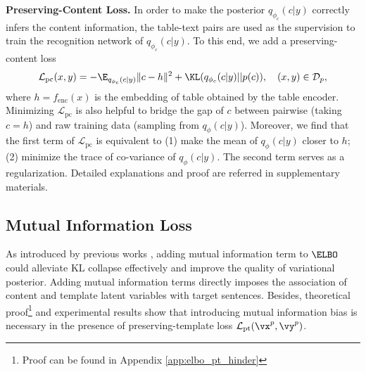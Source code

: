 \noindent\textbf{Preserving-Content Loss.}\quad
In order to make the posterior $q_{\phi_c}(c|y)$ correctly infers the content information, the table-text pairs are used as the supervision to train the recognition network of $q_{\phi_c}(c|y)$. To this end, we add a preserving-content loss
\begin{equation*}
    \mathcal{L}_{\text{pc}}(x,y) = -\E_{q_{\phi_c}(c|y)}\Vert c-h \Vert^2 + \KL (q_{\phi_c}(c|y) || p(c)), \quad (x,y) \in \mathcal{D}_p,
\end{equation*}
where $h=f_{\text{enc}}(x)$ is the embedding of table obtained by the table encoder. 
Minimizing $\mathcal{L}_{\text{pc}}$ is also helpful to bridge the gap of $c$ between pairwise (taking $c=h$) and raw training data (sampling from $q_\phi(c|y)$).
Moreover, we find that the first term of $\mathcal{L}_{\text{pc}}$ is equivalent to (1) make the mean of $q_\phi(c|y)$ closer to $h$; (2) minimize the trace of co-variance of $q_\phi(c|y)$. The second term serves as a regularization. Detailed explanations and proof are referred in supplementary materials. 
































\subsection{Mutual Information Loss}
\label{sec:mutual_info}
As introduced by previous works \citep{chen2016infogan,zhao2017infovae,zhao2018unsupervised}, adding mutual information term to $\ELBO$ could  alleviate KL collapse effectively and improve the quality of variational posterior. Adding mutual information terms directly imposes the association of content and template latent variables with target sentences. 
Besides, theoretical proof\footnote{Proof can be found in Appendix \ref{app:elbo_pt_hinder}} and experimental results show that introducing mutual information bias is necessary in the presence of preserving-template loss $\mathcal{L}_{\text{pt}}(\vx^p,\vy^p)$.

